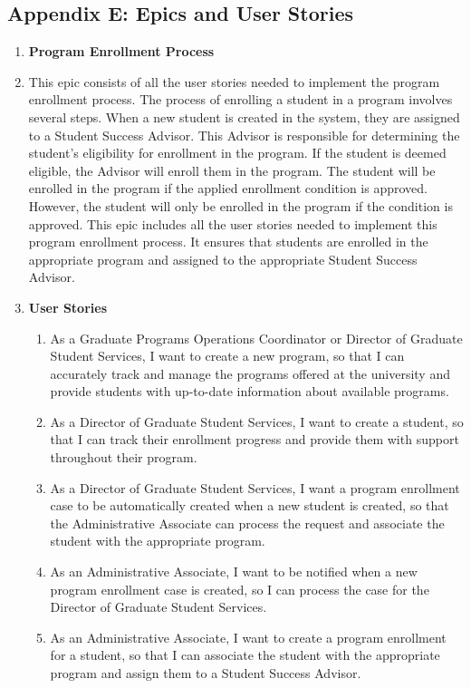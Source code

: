 \documentclass[12pt]{article}
\begin{document}
\begin{appendices}
\section{Appendix E: Epics and User Stories}
    \begin{enumerate}[label=(\roman*)]
        \item \textbf{Program Enrollment Process}
        \item[] This epic consists of all the user stories needed to implement the program enrollment process. The process of enrolling a student in a program involves several steps. When a new student is created in the system, they are assigned to a Student Success Advisor. This Advisor is responsible for determining the student's eligibility for enrollment in the program. If the student is deemed eligible, the Advisor will enroll them in the program. The student will be enrolled in the program if the applied enrollment condition is approved. However, the student will only be enrolled in the program if the condition is approved. This epic includes all the user stories needed to implement this program enrollment process. It ensures that students are enrolled in the appropriate program and assigned to the appropriate Student Success Advisor.
        \item[] \textbf{User Stories}
        \begin{enumerate}
            \item As a Graduate Programs Operations Coordinator or Director of Graduate Student Services, I want to create a new program, so that I can accurately track and manage the programs offered at the university and provide students with up-to-date information about available programs.
            \item As a Director of Graduate Student Services, I want to create a student, so that I can track their enrollment progress and provide them with support throughout their program.
            \item As a Director of Graduate Student Services, I want a program enrollment case to be automatically created when a new student is created, so that the Administrative Associate can process the request and associate the student with the appropriate program.
            \item As an Administrative Associate, I want to be notified when a new program enrollment case is created, so I can process the case for the Director of Graduate Student Services.
            \item As an Administrative Associate, I want to create a program enrollment for a student, so that I can associate the student with the appropriate program and assign them to a Student Success Advisor.

\end{enumerate}
\end{enumerate}
\end{appendices}
\end{document}
